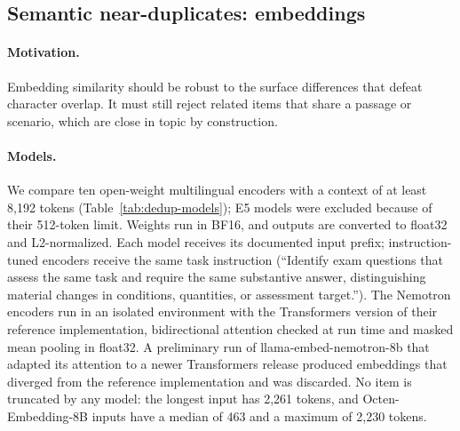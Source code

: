 \subsection{Semantic near-duplicates: embeddings}
\label{app:dedup-semantic}

\paragraph{Motivation.} Embedding similarity should be robust to the surface
differences that defeat character overlap. It must still reject related items
that share a passage or scenario, which are close in topic by construction.

\paragraph{Models.} We compare ten open-weight multilingual encoders with a
context of at least 8,192 tokens (Table~\ref{tab:dedup-models}); E5 models
were excluded because of their 512-token limit. Weights run in BF16, and
outputs are converted to float32 and L2-normalized. Each model receives its
documented input prefix; instruction-tuned encoders receive
the same task instruction (``Identify exam questions that assess the same
task and require the same substantive answer, distinguishing material changes
in conditions, quantities, or assessment target.''). The Nemotron encoders
run in an isolated environment with the Transformers version of their
reference implementation, bidirectional attention checked at run time and
masked mean pooling in float32. A preliminary run of llama-embed-nemotron-8b
that adapted its attention to a newer Transformers release produced
embeddings that diverged from the reference implementation and was
discarded. No item is truncated by any model: the longest input has 2,261
tokens, and Octen-Embedding-8B inputs have a median of 463 and a maximum of
2,230 tokens.

